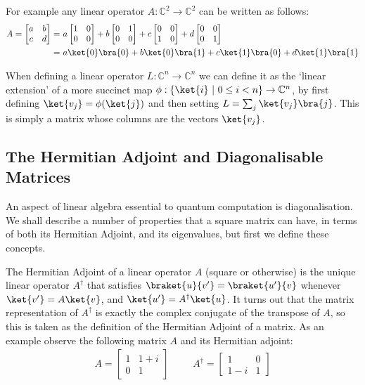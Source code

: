 For example any linear operator $A: \mathbb{C}^2 \to \mathbb{C}^2$ can be written as follows:
\begin{align*}
	A = \left[\begin{matrix}
		a&b\\
		c&d
	\end{matrix}\right]
	=&\ 
	a\left[\begin{matrix}
		1&0\\
		0&0
	\end{matrix}\right]
	+
	b\left[\begin{matrix}
		0&1\\
		0&0
	\end{matrix}\right]
	+
	c\left[\begin{matrix}
		0&0\\
		1&0
	\end{matrix}\right]
	+
	d\left[\begin{matrix}
		0&0\\
		0&1
	\end{matrix}\right]
	\\=&\  a\ket{0}\bra{0}+b\ket{0}\bra{1}+c\ket{1}\bra{0}+d\ket{1}\bra{1}
\end{align*}

When defining a linear operator $L: \mathbb{C}^n \to \mathbb{C}^n$ we can define it as the `linear extension' of a more succinct map $\phi: \{\ket{i}\ |\ 0 \leq i < n\} \to \mathbb{C}^n$, by first defining $\ket{v_j} = \phi(\ket{j})$ and then setting $L = \sum_{j} \ket{v_j}\bra{j}$. This is simply a matrix whose columns are the vectors $\ket{v_j}$.
\subsection{The Hermitian Adjoint and Diagonalisable Matrices}\label{diagonalisable}
An aspect of linear algebra essential to quantum computation is diagonalisation. We shall describe a number of properties that a square matrix can have, in terms of both its Hermitian Adjoint, and its eigenvalues, but first we define these concepts.

The Hermitian Adjoint of a linear operator $A$ (square or otherwise) is the unique linear operator $A^\dagger$ that satisfies $\braket{u}{v'} = \braket{u'}{v}$ whenever $\ket{v'} = A\ket{v}$, and $\ket{u'} = A^\dagger \ket{u}$. It turns out that the matrix representation of $A^\dagger$ is exactly the complex conjugate of the transpose of $A$, so this is taken as the definition of the Hermitian Adjoint of a matrix. As an example observe the following matrix $A$ and its Hermitian adjoint:
\begin{align*}
	A = \left[\begin{matrix}
		1 & 1+i\\
		0 & 1
	\end{matrix}\right]
	&&&
	A^\dagger = \left[\begin{matrix}
		1 & 0\\
		1-i & 1
	\end{matrix}\right]
\end{align*}

